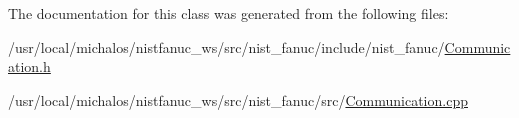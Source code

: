 The documentation for this class was generated from the following files\-:\begin{DoxyCompactItemize}
\item 
/usr/local/michalos/nistfanuc\-\_\-ws/src/nist\-\_\-fanuc/include/nist\-\_\-fanuc/\hyperlink{Communication_8h}{Communication.\-h}\item 
/usr/local/michalos/nistfanuc\-\_\-ws/src/nist\-\_\-fanuc/src/\hyperlink{Communication_8cpp}{Communication.\-cpp}\end{DoxyCompactItemize}
